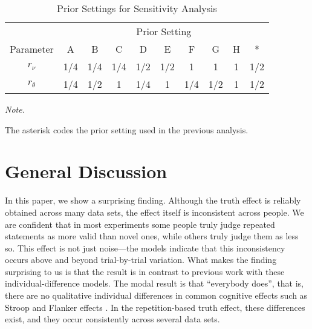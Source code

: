 \documentclass[
  english,
  ,man,floatsintext]{apa6}
\begin{document}
\begin{table}

\captionsetup{font=normalsize,labelfont=normalsize}
\caption{\label{tab:priorsettings}Prior Settings for Sensitivity Analysis}
\centering
\begin{threeparttable}
\begin{tabular}[t]{cccccccccc}
\toprule
\multicolumn{1}{c}{ } & \multicolumn{9}{c}{Prior Setting} \\
\cmidrule(l{3pt}r{3pt}){2-10}
Parameter & A & B & C & D & E & F & G & H & *\\
\midrule
$r_\nu$ & 1/4 & 1/4 & 1/4 & 1/2 & 1/2 & 1 & 1 & 1 & 1/2\\
$r_\theta$ & 1/4 & 1/2 & 1 & 1/4 & 1 & 1/4 & 1/2 & 1 & 1/2\\
\bottomrule
\end{tabular}
\begin{tablenotes}[para]
\item \textit{Note.} 
\item The asterisk codes the prior setting used in the previous analysis.
\end{tablenotes}
\end{threeparttable}
\end{table}

\hypertarget{general-discussion}{%
\section{General Discussion}\label{general-discussion}}

In this paper, we show a surprising finding. Although the truth effect is reliably obtained across many data sets, the effect itself is inconsistent across people. We are confident that in most experiments some people truly judge repeated statements as more valid than novel ones, while others truly judge them as less so. This effect is not just noise---the models indicate that this inconsistency occurs above and beyond trial-by-trial variation. What makes the finding surprising to us is that the result is in contrast to previous work with these individual-difference models. The modal result is that ``everybody does'', that is, there are no qualitative individual differences in common cognitive effects such as Stroop and Flanker effects \autocite{haaf2017,haaf2019}. In the repetition-based truth effect, these differences exist, and they occur consistently across several data sets.
\end{document}
